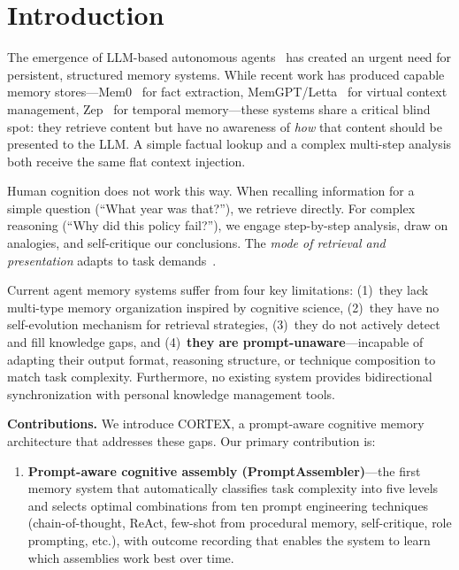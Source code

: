 \documentclass[runningheads]{llncs}
\begin{document}
\section{Introduction}\label{sec:intro}

The emergence of LLM-based autonomous agents~\cite{weng2023agent,sumers2023cognitive} has created an urgent need for persistent, structured memory systems. While recent work has produced capable memory stores---Mem0~\cite{mem0_2024} for fact extraction, MemGPT/Letta~\cite{packer2023memgpt} for virtual context management, Zep~\cite{zep2024} for temporal memory---these systems share a critical blind spot: they retrieve content but have no awareness of \textit{how} that content should be presented to the LLM. A simple factual lookup and a complex multi-step analysis both receive the same flat context injection.

Human cognition does not work this way. When recalling information for a simple question (``What year was that?''), we retrieve directly. For complex reasoning (``Why did this policy fail?''), we engage step-by-step analysis, draw on analogies, and self-critique our conclusions. The \textit{mode of retrieval and presentation} adapts to task demands~\cite{tulving1972episodic,squire2004memory,baddeley2000working}.

Current agent memory systems suffer from four key limitations: (1)~they lack multi-type memory organization inspired by cognitive science, (2)~they have no self-evolution mechanism for retrieval strategies, (3)~they do not actively detect and fill knowledge gaps, and (4)~\textbf{they are prompt-unaware}---incapable of adapting their output format, reasoning structure, or technique composition to match task complexity. Furthermore, no existing system provides bidirectional synchronization with personal knowledge management tools.

\textbf{Contributions.} We introduce CORTEX, a prompt-aware cognitive memory architecture that addresses these gaps. Our primary contribution is:

\begin{enumerate}[leftmargin=*]
    \item \textbf{Prompt-aware cognitive assembly (PromptAssembler)}---the first memory system that automatically classifies task complexity into five levels and selects optimal combinations from ten prompt engineering techniques (chain-of-thought, ReAct, few-shot from procedural memory, self-critique, role prompting, etc.), with outcome recording that enables the system to learn which assemblies work best over time.
\end{enumerate}
\end{document}
